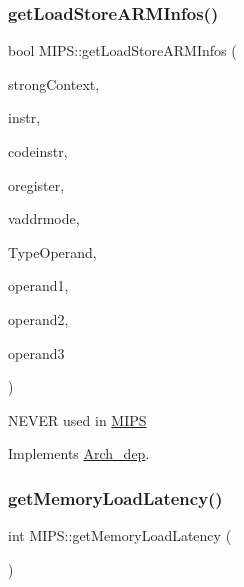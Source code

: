 \subsubsection{\texorpdfstring{get\+Load\+Store\+A\+R\+M\+Infos()}{getLoadStoreARMInfos()}}
{\footnotesize\ttfamily bool M\+I\+P\+S\+::get\+Load\+Store\+A\+R\+M\+Infos (\begin{DoxyParamCaption}\item[{bool}]{strong\+Context,  }\item[{string \&}]{instr,  }\item[{string \&}]{codeinstr,  }\item[{string \&}]{oregister,  }\item[{\hyperlink{arch_8h_aa5cfff0cd9c5ad5ebda7aeecc4a50c2b}{Addressing\+Mode} $\ast$}]{vaddrmode,  }\item[{\hyperlink{arch_8h_a63b66e201ffc27bbc8f89c8808382044}{offset\+Type} $\ast$}]{Type\+Operand,  }\item[{string \&}]{operand1,  }\item[{string \&}]{operand2,  }\item[{string \&}]{operand3 }\end{DoxyParamCaption})\hspace{0.3cm}{\ttfamily [virtual]}}

N\+E\+V\+ER used in \hyperlink{classMIPS}{M\+I\+PS} 

Implements \hyperlink{classArch__dep_a18db69d3e03bcfbcf5b7d3b36b4f409c}{Arch\+\_\+dep}.

\mbox{\label{classMIPS_a9b69a65d964ddba7bcc00d6219262740}} 
\subsubsection{\texorpdfstring{get\+Memory\+Load\+Latency()}{getMemoryLoadLatency()}}
{\footnotesize\ttfamily int M\+I\+P\+S\+::get\+Memory\+Load\+Latency (\begin{DoxyParamCaption}{ }\end{DoxyParamCaption})}

\mbox{\label{classMIPS_a4a7d7555f5e7fb53cf39be02f6f27fc5}} 
